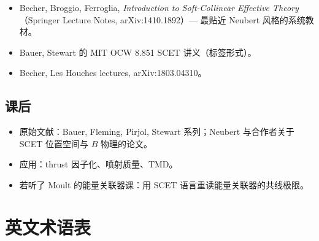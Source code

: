 \documentclass[11pt,a4paper]{article}
\theoremstyle{definition}
\theoremstyle{plain}
\theoremstyle{remark}
\begin{document}
\begin{itemize}[leftmargin=1.4em]
  \item Becher, Broggio, Ferroglia, \emph{Introduction to Soft-Collinear Effective Theory}（Springer Lecture Notes, arXiv:1410.1892）--- 最贴近 Neubert 风格的系统教材。
  \item Bauer, Stewart 的 MIT OCW 8.851 SCET 讲义（标签形式）。
  \item Becher, Les Houches lectures, arXiv:1803.04310。
\end{itemize}

\subsection{课后}

\begin{itemize}[leftmargin=1.4em]
  \item 原始文献：Bauer, Fleming, Pirjol, Stewart 系列；Neubert 与合作者关于 SCET 位置空间与 $B$ 物理的论文。
  \item 应用：thrust 因子化、喷射质量、TMD。
  \item 若听了 Moult 的能量关联器课：用 SCET 语言重读能量关联器的共线极限。
\end{itemize}

\section{英文术语表}
\label{sec:glossary}
\end{document}
